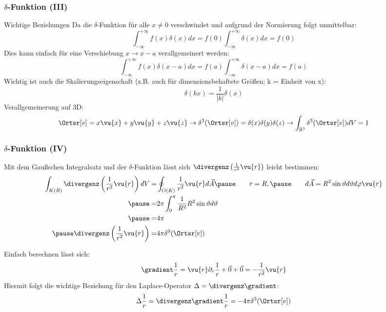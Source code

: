 \begin{frame}
  \frametitle{$\delta$-Funktion (III)}
  \begin{block}{Wichtige Beziehungen}
\pause Da die $\delta$-Funktion für alle $x\neq 0$ verschwindet und aufgrund
der Normierung folgt unmittelbar:
$$
\int_{-\infty}^{+\infty} f(x) \delta(x) dx = f(0) \int_{-\infty}^{+\infty}
 \delta(x) dx =  f(0)
 $$\pause
 Dies kann einfach für eine Verschiebung $x\to x-a$ verallgemeinert
 werden:
 $$
\int_{-\infty}^{+\infty} f(x) \delta(x-a) dx = f(a) \int_{-\infty}^{+\infty}
 \delta(x-a) dx =  f(a)
 $$\pause
 Wichtig ist auch die Skalierungseigenschaft (z.B. auch für
 dimensionsbehaftete Größen; k = Einheit von x):
 $$
\delta(kx)  = \frac{1}{|k|}\delta(x)
$$\pause
Verallgemeinerung auf 3D:
$$
\Ortsr[v] = x\vu{x} +y\vu{y}+z\vu{z} \to
\delta^3(\Ortsr[v])=\delta(x) \delta(y) \delta(z) \to
\int_{\mathbb{R}^3} \delta^3(\Ortsr[v]) dV = 1 
$$
 
 

\end{block}
\end{frame}
\begin{frame}
  \frametitle{$\delta$-Funktion (IV)}
Mit dem Gaußschen Integralsatz und der $\delta$-Funktion lässt sich
$\divergenz\left(\frac{1}{r^2}\vu{r}\right)$ leicht bestimmen:
\begin{align*}
  \int_{K(R)} \divergenz\left(\frac{1}{r^2}\vu{r}\right) dV = &
                                                             \oint_{O(K)}
                                                             \frac{1}{r^2}\vu{r}
                                                             d\vec{A}\pause
                                                             \qquad r=R,\pause
                                                            \qquad d\vec{A} =
                                                             R^2
                                                             \sin\vartheta
                                                             d\vartheta
                                                             d\varphi
                                                              \vu{r}
  \\\pause
  = & 2\pi \int_0^\pi \frac{1}{R^2} R^2 \sin\vartheta d\vartheta \\
  \pause
  = & 4\pi \\\pause
  \divergenz\left(\frac{1}{r^2}\vu{r}\right)  =& 4\pi\delta^3(\Ortsr[v])
\end{align*}\pause

Einfach berechnen lässt sich:
$$
\gradient \frac{1}{r} = \vu{r} \partial_r \frac{1}{r} + \vec{0} + \vec{0} =-\frac{1}{r^2} \vu{r}
$$\pause
Hiermit folgt die wichtige Beziehung für den \alert{Laplace-Operator}
$\Delta = \divergenz\gradient$:
$$
\Delta \frac{1}{r} = \divergenz\gradient \frac{1}{r} = -4\pi\delta^3(\Ortsr[v]) 
$$
\end{frame}
